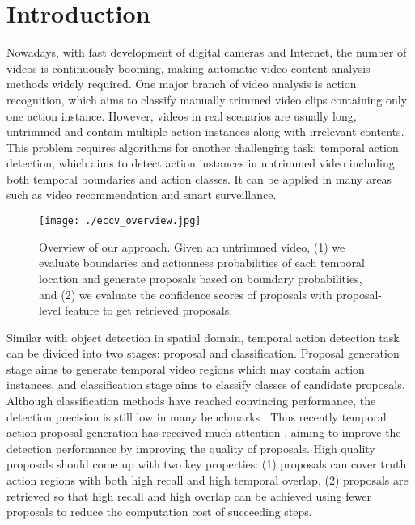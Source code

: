 \documentclass[runningheads]{llncs}
\begin{document}
\section{Introduction}



Nowadays, with fast development of  digital cameras and Internet, the number of videos is continuously booming,  making automatic  video content analysis methods widely required.
One major branch of video analysis is action recognition, which aims to classify manually trimmed video clips containing only one action instance.
However, videos in real scenarios are usually long, untrimmed and contain multiple action instances along with irrelevant contents. This problem requires algorithms for another challenging task: temporal action detection, which aims to detect action instances in untrimmed video including both temporal boundaries and action classes. It can be applied in many areas such as video recommendation and smart surveillance.

\begin{figure}[t]
\setlength{\abovecaptionskip}{-0.3cm} \setlength{\belowcaptionskip}{-0.5cm} \begin{center}
\begin{minipage}[b]{1.0\linewidth}
  \centering
  \centerline{\texttt{[image: ./eccv\_overview.jpg]}}
\medskip
\end{minipage}
\end{center}
   \caption{Overview of our approach. Given an untrimmed video, (1) we evaluate boundaries and actionness probabilities of each temporal location and generate proposals based on boundary probabilities, and (2) we evaluate the confidence scores of proposals with proposal-level feature to get retrieved proposals.}
\label{fig_overview}
\end{figure}



Similar with object detection in spatial domain, temporal action detection task can be divided into two stages: proposal and classification. Proposal generation stage aims to generate temporal video regions which may contain action instances, and classification stage aims to classify classes of candidate proposals. 
Although  classification methods  have reached convincing performance,  the detection precision is still low in many benchmarks \cite{caba2015activitynet,jiang2014thumos}. 
Thus recently temporal action proposal generation has received much attention  \cite{sst_buch_cvpr17,fast_temporal_activity_cvpr16,escorcia2016daps,gao2017turn}, aiming to improve the detection performance by improving the quality of proposals.
High quality proposals should come up with two key properties: (1) proposals can cover truth action regions with both high recall and high temporal overlap, (2) proposals are retrieved so that high recall and high overlap can be achieved using fewer proposals to reduce the computation cost of succeeding steps.
\end{document}
